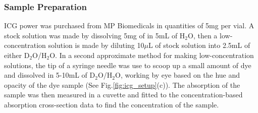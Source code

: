 \subsubsection{Sample Preparation}
ICG power was purchased from MP Biomedicals in quantities of 5mg per vial. A stock solution was made by dissolving 5mg of in 5mL of H${}_2$O, then a low-concentration solution is made by diluting 10$\mu$L of stock solution into 2.5mL of either D${}_2$O/H${}_2$O.  In a second approximate method for making low-concentration solutions, the tip of a syringe needle was use to scoop up a small amount of dye and dissolved in 5-10mL of D${}_2$O/H${}_2$O, working by eye based on the hue and opacity of the dye sample (See Fig.\ref{fig:icg_setup}(c)). The absorption of the sample was then measured in a cuvette and fitted to the concentration-based absorption cross-section data to find the concentration of the sample.
\clearpage
